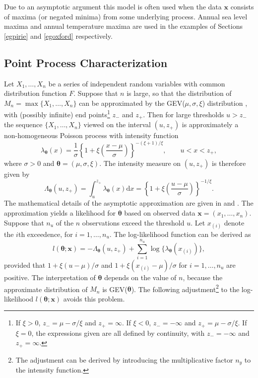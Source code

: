 \documentclass[11pt,a4paper]{article}
\newcommand{\bs}{\boldsymbol}
\begin{document}
Due to an asymptotic argument \citep[e.g.][]{cole01} this model is often used when the data $\bs{x}$ consists of maxima (or negated minima) from some underlying process.  
Annual sea level maxima and annual temperature maxima are used in the examples of Sections \ref{egpirie} and \ref{egoxford} respectively.

\subsection{Point Process Characterization}
\label{lhpp}

Let $X_1,\dots,X_n$ be a series of independent random variables with common distribution function $F$.
Suppose that $n$ is large, so that the distribution of $M_n = \max\{X_1,\dots,X_n\}$ can be approximated by the GEV($\mu,\sigma,\xi$) distribution \citep[e.g.][]{cole01}, with (possibly infinite) end points\footnote{If $\xi>0$, $z_- = \mu-\sigma/\xi$ and $z_+ = \infty$. If $\xi<0$, $z_- = -\infty$ and $z_+ = \mu-\sigma/\xi$. If $\xi=0$, the expressions given are all defined by continuity, with $z_- = -\infty$ and $z_+ = \infty$.} $z_-$ and $z_+$.  
Then for large thresholds $u > z_-$ the sequence $\{X_1,\dots,X_n\}$ viewed on the interval $(u,z_+)$ is approximately a non-homogeneous Poisson process with intensity function
\begin{equation*}
\lambda_{\bs{\theta}}(x) = \frac{1}{\sigma} \left\{1 + \xi\left(\frac{x-\mu}{\sigma}\right)\right\}^{-(\xi+1)/\xi}, \qquad u < x < z_+,
\end{equation*}
where $\sigma > 0$ and $\bs{\theta} = (\mu,\sigma,\xi)$.
The intensity measure on $(u,z_+)$ is therefore given by
\begin{equation*}
\Lambda_{\bs{\theta}}(u,z_+) = \int_u^{z_+} \lambda_{\bs{\theta}}(x) \text{d}x =
\left\{1 + \xi\left(\frac{u-\mu}{\sigma}\right)\right\}^{-1/\xi}.
\end{equation*}
The mathematical details of the asymptotic approximation are given in \citet{pick71} and \citet{smit89}.
The approximation yields a likelihood for $\bs{\theta}$ based on observed data $\bs{x} = (x_1,\dots,x_n)$. 
Suppose that $n_u$ of the $n$ observations exceed the threshold $u$. 
Let $x_{(i)}$ denote the $i$th exceedence, for $i=1,\dots,n_u$.
The log-likelihood function can be derived \citep{cole01} as
\begin{equation*}
l(\bs{\theta} ; \bs{x}) = -\Lambda_{\bs{\theta}}(u,z_+) + \sum_{i=1}^{n_u} \log\{\lambda_{\bs{\theta}}(x_{(i)})\},
\end{equation*}
provided that $1 + \xi(u-\mu)/\sigma$ and $1 + \xi(x_{(i)}-\mu)/\sigma$ for $i=1,\dots,n_u$ are positive. 
The interpretation of $\bs{\theta}$ depends on the value of $n$, because the approximate distribution of $M_n$ is GEV($\bs{\theta}$).
The following adjustment\footnote{The adjustment can be derived by introducing the multiplicative factor $n_y$ to the intensity function.} to the log-likelihood $l(\bs{\theta} ; \bs{x})$ avoids this problem.
  
\end{document}
